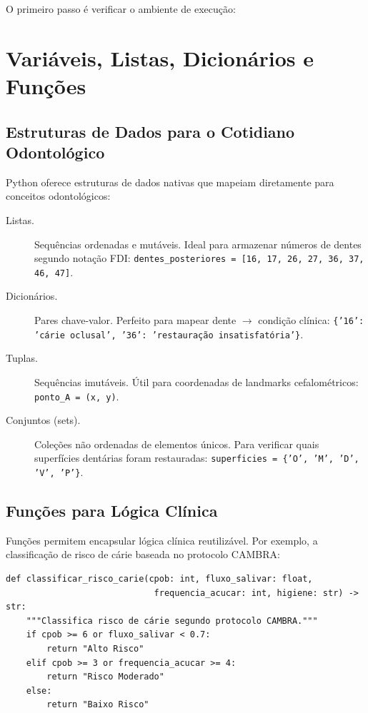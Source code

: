 O primeiro passo é verificar o ambiente de execução:



\section{Variáveis, Listas, Dicionários e Funções}

\subsection{Estruturas de Dados para o Cotidiano Odontológico}

Python oferece estruturas de dados nativas que mapeiam diretamente para conceitos odontológicos:

\begin{description}
    \item[Listas.] Sequências ordenadas e mutáveis. Ideal para armazenar números de dentes segundo notação FDI: \texttt{dentes\_posteriores = [16, 17, 26, 27, 36, 37, 46, 47]}.
    \item[Dicionários.] Pares chave-valor. Perfeito para mapear dente $\rightarrow$ condição clínica: \texttt{\{'16': 'cárie oclusal', '36': 'restauração insatisfatória'\}}.
    \item[Tuplas.] Sequências imutáveis. Útil para coordenadas de landmarks cefalométricos: \texttt{ponto\_A = (x, y)}.
    \item[Conjuntos (sets).] Coleções não ordenadas de elementos únicos. Para verificar quais superfícies dentárias foram restauradas: \texttt{superficies = \{'O', 'M', 'D', 'V', 'P'\}}.
\end{description}

\subsection{Funções para Lógica Clínica}

Funções permitem encapsular lógica clínica reutilizável. Por exemplo, a classificação de risco de cárie baseada no protocolo CAMBRA:

\begin{verbatim}
def classificar_risco_carie(cpob: int, fluxo_salivar: float,
                             frequencia_acucar: int, higiene: str) -> str:
    """Classifica risco de cárie segundo protocolo CAMBRA."""
    if cpob >= 6 or fluxo_salivar < 0.7:
        return "Alto Risco"
    elif cpob >= 3 or frequencia_acucar >= 4:
        return "Risco Moderado"
    else:
        return "Baixo Risco"
\end{verbatim}

